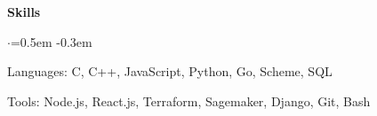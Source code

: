 \documentclass{resume} %
\DeclareRobustCommand{\&}{%
  \ifdim\fontdimen1\font>0pt
    \textsl{\symbol{`\&}}%
  \else
    \symbol{`\&}%
  \fi
}
\begin{document}

\begin{rSection}{\textbf{Skills}}
  \vspace {0.3em} 
  \begin{list}{$\cdot$}{\leftmargin=0.5em}
    \itemsep -0.3em \vspace{-0.3em}
    \item Languages: C, C++, JavaScript, Python, Go, Scheme, SQL
    \item Tools: Node.js, React.js, Terraform, Sagemaker, Django, Git, Bash
  \end{list}
  \vspace{0.3em}
\end{rSection}

\end{document}
